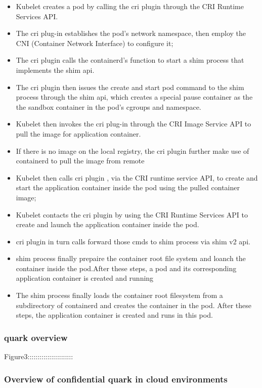     \begin{itemize}
        \item Kubelet creates a pod by calling the cri plugin through the CRI Runtime Services API.
        \item The cri plug-in establishes the pod's network namespace, then employ the CNI (Container Network Interface) to configure it;
        \item The cri plugin calls the containerd's function to start a shim process that implements the shim api.
        \item The cri plugin then issues the create and start pod command to the shim process through the shim api, which creates a special pause container as the the sandbox container in the pod's cgroups and namespace.
        \item Kubelet then invokes the cri plug-in through the CRI Image Service API to pull the image for application container.
        \item If there is no image on the local registry, the cri plugin further make use of containerd to pull the image from remote
        \item Kubelet then calls cri plugin , via the CRI runtime service API, to create and start the application container inside the pod using the pulled container image;
        \item Kubelet contacts the cri plugin by using the CRI Runtime Services API to create and launch the application container inside the pod.
        \item cri plugin in turn calls forward those cmds to shim process via shim v2 api.
        \item shim process finally prepaire the container root file system  and loanch the container inside the pod.After these steps, a pod and its corresponding application container is created and running
        \item The shim process finally loads the container root filesystem from a subdirectory of containerd and creates the container in the pod. After these steps, the application container is created and runs in this pod.
    \end{itemize}


\subsubsection{quark overview}

Figure3:::::::::::::::::::::::

\subsubsection{Overview of confidential quark in cloud environments}

